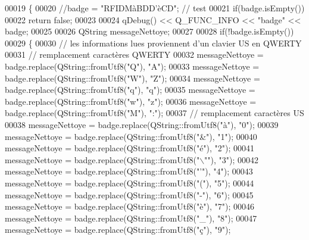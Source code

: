 \begin{DoxyCode}
00019 \{
00020     \textcolor{comment}{//badge = "RFIDMàBDD'èCD"; // test}
00021     \textcolor{keywordflow}{if}(badge.isEmpty())
00022         \textcolor{keywordflow}{return} \textcolor{keyword}{false};
00023 
00024     qDebug() << Q\_FUNC\_INFO << \textcolor{stringliteral}{"badge"} << badge;
00025 
00026     QString messageNettoye;
00027 
00028     \textcolor{keywordflow}{if}(!badge.isEmpty())
00029     \{
00030         \textcolor{comment}{// les informations lues proviennent d'un clavier US en QWERTY}
00031         \textcolor{comment}{// remplacement caractères QWERTY}
00032         messageNettoye = badge.replace(QString::fromUtf8(\textcolor{stringliteral}{"Q"}), \textcolor{stringliteral}{"A"});
00033         messageNettoye = badge.replace(QString::fromUtf8(\textcolor{stringliteral}{"W"}), \textcolor{stringliteral}{"Z"});
00034         messageNettoye = badge.replace(QString::fromUtf8(\textcolor{stringliteral}{"q"}), \textcolor{stringliteral}{"q"});
00035         messageNettoye = badge.replace(QString::fromUtf8(\textcolor{stringliteral}{"w"}), \textcolor{stringliteral}{"z"});
00036         messageNettoye = badge.replace(QString::fromUtf8(\textcolor{stringliteral}{"M"}), \textcolor{stringliteral}{":"});
00037         \textcolor{comment}{// remplacement caractères US}
00038         messageNettoye = badge.replace(QString::fromUtf8(\textcolor{stringliteral}{"à"}), \textcolor{stringliteral}{"0"});
00039         messageNettoye = badge.replace(QString::fromUtf8(\textcolor{stringliteral}{"&"}), \textcolor{stringliteral}{"1"});
00040         messageNettoye = badge.replace(QString::fromUtf8(\textcolor{stringliteral}{"é"}), \textcolor{stringliteral}{"2"});
00041         messageNettoye = badge.replace(QString::fromUtf8(\textcolor{stringliteral}{"\(\backslash\)""}), \textcolor{stringliteral}{"3"});
00042         messageNettoye = badge.replace(QString::fromUtf8(\textcolor{stringliteral}{"'"}), \textcolor{stringliteral}{"4"});
00043         messageNettoye = badge.replace(QString::fromUtf8(\textcolor{stringliteral}{"("}), \textcolor{stringliteral}{"5"});
00044         messageNettoye = badge.replace(QString::fromUtf8(\textcolor{stringliteral}{"-"}), \textcolor{stringliteral}{"6"});
00045         messageNettoye = badge.replace(QString::fromUtf8(\textcolor{stringliteral}{"è"}), \textcolor{stringliteral}{"7"});
00046         messageNettoye = badge.replace(QString::fromUtf8(\textcolor{stringliteral}{"\_"}), \textcolor{stringliteral}{"8"});
00047         messageNettoye = badge.replace(QString::fromUtf8(\textcolor{stringliteral}{"ç"}), \textcolor{stringliteral}{"9"});

\end{DoxyCode}
